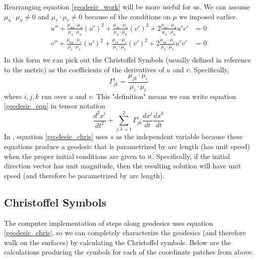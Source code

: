 \documentclass{article}
\begin{document}
		Rearranging equation \ref{geodesic_work} will be more useful for us. We can assume $\mu_u \cdot \mu_u \neq 0$  and $\mu_v \cdot \mu_v \neq 0$ because of the conditions on $\mu$ we imposed earlier.
		\begin{equation} \label{geodesic_eqn} \begin{split}
			u'' + \frac{\mu_{uu} \cdot \mu_u}{\mu_u \cdot \mu_u} (u')^2 + \frac{\mu_{vv} \cdot \mu_u}{\mu_u \cdot \mu_u} (v')^2 + 2\frac{\mu_{uv} \cdot \mu_u}{\mu_u \cdot \mu_u} u'v' & = 0 \\
			v'' + \frac{\mu_{uu} \cdot \mu_v}{\mu_v \cdot \mu_v} (u')^2 + \frac{\mu_{vv} \cdot \mu_v}{\mu_v \cdot \mu_v} (v')^2 + 2\frac{\mu_{uv} \cdot \mu_v}{\mu_v \cdot \mu_v} u'v' & = 0 \\
		\end{split} \end{equation}
		In this form we can pick out the Christoffel Symbols (usually defined in reference to the metric) as the coefficients of the derivatives of $u$ and $v$. Specifically,
		\begin{equation}
			\Gamma^i_{jk} = \frac{\mu_{jk} \cdot \mu_i}{\mu_i \cdot \mu_i}
		\end{equation}
		where $i,j,k$ run over $u$ and $v$.
		This "definition" means we can write equation \ref{geodesic_eqn} in tensor notation
		\begin{equation} \label{geodesic_chris}
			\frac{d^2 x^i}{dt^2} + \sum_{j,k = 1}^2 \Gamma^i_{jk} \frac{d x^j}{dt} \frac{dx^k}{dt}
		\end{equation}
		In \cite{BanchoffLovett_DiffGeo_2010}, equation \ref{geodesic_chris} uses $s$ as the independent variable because these equations produce a geodesic that is parametrized by arc length (has unit speed) when the proper initial conditions are given to it.
		Specifically, if the initial direction vector has unit magnitude, then the resulting solution will have unit speed (and therefore be parametrized by arc length).
		
	\subsection{Christoffel Symbols}
		The computer implementation of steps along geodesics uses equation \ref{geodesic_chris}, so we can completely characterize the geodesics (and therefore walk on the surfaces) by calculating the Christoffel symbols.
		Below are the calculations producing the symbols for each of the coordinate patches from above.
		
\end{document}
